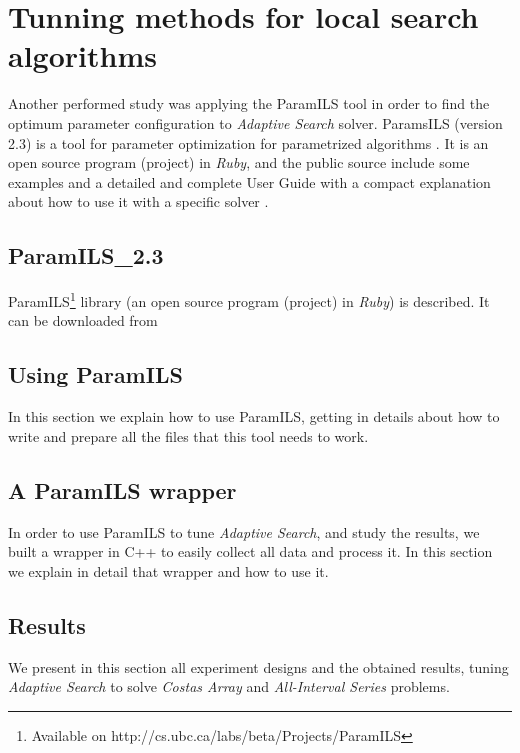 \documentclass[a4paper]{book} %
\begin{document}
\section{Tunning methods for local search algorithms}
\label{sec:tunning}

Another performed study was applying the {\sc ParamILS} tool in order to find the optimum parameter configuration to {\it Adaptive Search} solver. {\sc ParamsILS} (version 2.3) is a tool for parameter optimization for parametrized algorithms \cite{Hutter2009}. 
It is an open source program (project) in {\it Ruby}, and the public source include some examples and a detailed and complete User Guide with a compact explanation about how to use it with a specific solver \cite{Hutter2008}.

\subsection{ParamILS\_2.3}

{\sc ParamILS}\footnote{Available on http://cs.ubc.ca/labs/beta/Projects/ParamILS} library (an open source program (project) in {\it Ruby}) is described. It can be downloaded from  

\subsection{Using ParamILS}

In this section we explain how to use {\sc ParamILS}, getting in details about how to write and prepare all the files that this tool needs to work.

\subsection{A ParamILS wrapper}

In order to use {\sc ParamILS} to tune \textit{Adaptive Search}, and study the results, we built a wrapper in C++ to easily collect all data and process it. In this section we explain in detail that wrapper and how to use it.

\subsection{Results}

We present in this section all experiment designs and the obtained results, tuning \textit{Adaptive Search} to solve \textit{Costas Array} and \textit{All-Interval Series} problems.
\end{document}
